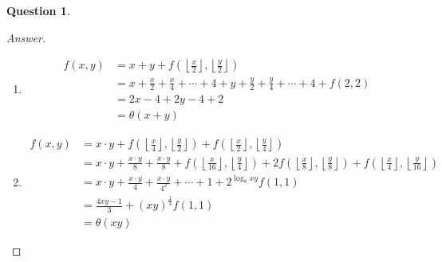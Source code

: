 \documentclass{article}
\theoremstyle{plain}
\newtheorem{question}{Question}
\newenvironment{answer}[1][Answer]
    {\begin{proof}[#1]{$ $}\renewcommand\qedsymbol{$\vartriangle$}}
    {\end{proof}}
\begin{document}
\begin{question}
\end{question}
\begin{answer}
    \begin{enumerate}
        \item
        \begin{equation*}
        \begin{aligned}
        f(x, y) &=x+y+f\left(\left\lfloor\frac{x}{2}\right\rfloor, \left\lfloor\frac{y}{2}\right\rfloor\right) \\
        &=x+\frac{x}{2}+\frac{x}{4}+\cdots+4+y+\frac{y}{2}+\frac{y}{4}+\cdots+4+f(2,2) \\
        &=2 x-4+2 y-4+2 \\
        &=\theta(x+y)
        \end{aligned}
        \end{equation*}
        \item
        \begin{equation*}
        \begin{aligned}
        f(x, y) &=x\cdot y+f(\left\lfloor \frac{x}{4}\right\rfloor,\left\lfloor\frac{y}{2} \right\rfloor)+f\left(\left\lfloor\frac{x}{2}\right\rfloor,\left\lfloor\frac{y}{4}\right\rfloor\right) \\
        &=x \cdot y+\frac{x \cdot y}{8}+\frac{x \cdot y}{8}+f\left(\left\lfloor\frac{x}{16}\right\rfloor, \left\lfloor\frac{y}{4}\right\rfloor\right)+2 f\left(
         \left\lfloor\frac{x}{8}\right\rfloor, \left\lfloor\frac{y}{8}\right\rfloor\right)+
        f\left(\left\lfloor\frac{x}{4}\right\rfloor, \left\lfloor \frac{y}{16}\right\rfloor \right) \\
        &=x \cdot y+\frac{x \cdot y}{4}+\frac{x \cdot y}{4^{2}}+\cdots+1+2^{\log _{8} x y} f(1,1) \\
        &=\frac{4 x y-1}{3}+(x y)^{\frac{1}{3}} f(1,1) \\
        &=\theta(x y)
        \end{aligned}
        \end{equation*}
    \end{enumerate}
\end{answer}
\end{document}
